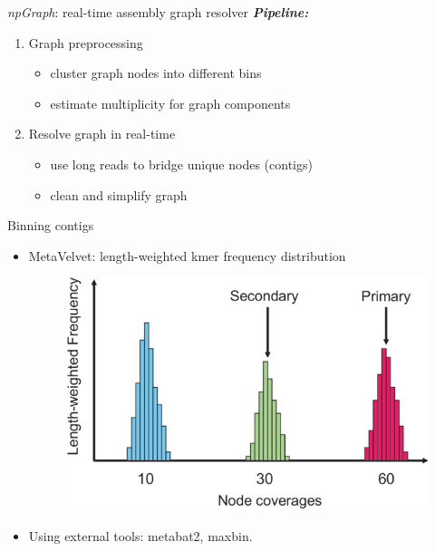 \documentclass{beamer}
\begin{document}
\begin{frame}{\emph{npGraph}: real-time assembly graph resolver}
\emph{\textbf{Pipeline:}}
\begin{enumerate}
  \item Graph preprocessing
  \begin{itemize}
    \item cluster graph nodes into different bins
    \item estimate multiplicity for graph components
  \end{itemize}
  \item Resolve graph in real-time
  \begin{itemize}
  	\item use long reads to bridge unique nodes (contigs)
  	\item clean and simplify graph
  \end{itemize}
\end{enumerate}
\end{frame}
\begin{frame}{Binning contigs}
\begin{itemize}
	\item MetaVelvet: length-weighted kmer frequency distribution
		\begin{figure}[!hpb]
		\centering
		\includegraphics[width=.45\textwidth]{figures/metavelvet.jpg}
		\end{figure}
	\item Using external tools: metabat2, maxbin.
\end{itemize}
\end{frame}
\end{document}

